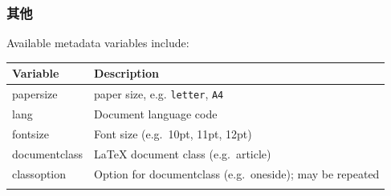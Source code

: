 \documentclass[]{book}
\theoremstyle{definition}
\theoremstyle{definition}
\theoremstyle{definition}
\theoremstyle{remark}
\begin{document}
\subsubsection{其他}

Available metadata variables include:

\begin{longtable}[]{@{}ll@{}}
\toprule
\begin{minipage}[b]{0.47\columnwidth}\raggedright
Variable\strut
\end{minipage} & \begin{minipage}[b]{0.47\columnwidth}\raggedright
Description\strut
\end{minipage}\tabularnewline
\midrule
\endhead
\begin{minipage}[t]{0.47\columnwidth}\raggedright
papersize\strut
\end{minipage} & \begin{minipage}[t]{0.47\columnwidth}\raggedright
paper size, e.g. \texttt{letter}, \texttt{A4}\strut
\end{minipage}\tabularnewline
\begin{minipage}[t]{0.47\columnwidth}\raggedright
lang\strut
\end{minipage} & \begin{minipage}[t]{0.47\columnwidth}\raggedright
Document language code\strut
\end{minipage}\tabularnewline
\begin{minipage}[t]{0.47\columnwidth}\raggedright
fontsize\strut
\end{minipage} & \begin{minipage}[t]{0.47\columnwidth}\raggedright
Font size (e.g.~10pt, 11pt, 12pt)\strut
\end{minipage}\tabularnewline
\begin{minipage}[t]{0.47\columnwidth}\raggedright
documentclass\strut
\end{minipage} & \begin{minipage}[t]{0.47\columnwidth}\raggedright
LaTeX document class (e.g.~article)\strut
\end{minipage}\tabularnewline
\begin{minipage}[t]{0.47\columnwidth}\raggedright
classoption\strut
\end{minipage} & \begin{minipage}[t]{0.47\columnwidth}\raggedright
Option for documentclass (e.g.~oneside); may be repeated\strut
\end{minipage}\tabularnewline
\begin{minipage}[t]{0.47\columnwidth}\raggedright

\end{minipage}
\end{longtable}
\end{document}
